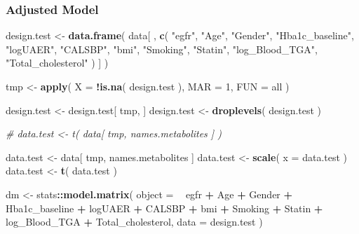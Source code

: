 \documentclass[]{article}
\newenvironment{Shaded}{\begin{snugshade}}{\end{snugshade}}
\newcommand{\CommentTok}[1]{\textcolor[rgb]{0.56,0.35,0.01}{\textit{#1}}}
\newcommand{\DataTypeTok}[1]{\textcolor[rgb]{0.13,0.29,0.53}{#1}}
\newcommand{\DecValTok}[1]{\textcolor[rgb]{0.00,0.00,0.81}{#1}}
\newcommand{\KeywordTok}[1]{\textcolor[rgb]{0.13,0.29,0.53}{\textbf{#1}}}
\newcommand{\NormalTok}[1]{#1}
\newcommand{\OperatorTok}[1]{\textcolor[rgb]{0.81,0.36,0.00}{\textbf{#1}}}
\newcommand{\StringTok}[1]{\textcolor[rgb]{0.31,0.60,0.02}{#1}}
\begin{document}
\newpage

\hypertarget{adjusted-model-1}{%
\subsubsection{Adjusted Model}\label{adjusted-model-1}}

\begin{Shaded}
\begin{Highlighting}[]
\NormalTok{design.test <-}\StringTok{ }
\StringTok{  }\KeywordTok{data.frame}\NormalTok{(}
\NormalTok{    data[ , }
          \KeywordTok{c}\NormalTok{(}
            \StringTok{"egfr"}\NormalTok{,}
            \StringTok{"Age"}\NormalTok{,}
            \StringTok{"Gender"}\NormalTok{, }
            \StringTok{"Hba1c_baseline"}\NormalTok{,}
            \StringTok{"logUAER"}\NormalTok{,}
            \StringTok{"CALSBP"}\NormalTok{,}
            \StringTok{"bmi"}\NormalTok{,}
            \StringTok{"Smoking"}\NormalTok{,}
            \StringTok{"Statin"}\NormalTok{,}
            \StringTok{"log_Blood_TGA"}\NormalTok{,}
            \StringTok{"Total_cholesterol"}
\NormalTok{          )}
\NormalTok{          ]}
\NormalTok{  )}

\NormalTok{tmp <-}\StringTok{ }
\StringTok{  }\KeywordTok{apply}\NormalTok{( }
    \DataTypeTok{X =} \OperatorTok{!}\KeywordTok{is.na}\NormalTok{( design.test ),}
    \DataTypeTok{MAR =} \DecValTok{1}\NormalTok{,}
    \DataTypeTok{FUN =}\NormalTok{ all}
\NormalTok{  )}

\NormalTok{design.test <-}\StringTok{ }\NormalTok{design.test[ tmp, ]}
\NormalTok{design.test <-}\StringTok{ }\KeywordTok{droplevels}\NormalTok{( design.test )}

\CommentTok{# data.test <- t( data[ tmp, names.metabolites ] )}

\NormalTok{data.test <-}\StringTok{ }\NormalTok{data[ tmp, names.metabolites ]}
\NormalTok{data.test <-}\StringTok{ }\KeywordTok{scale}\NormalTok{( }\DataTypeTok{x =}\NormalTok{ data.test )}
\NormalTok{data.test <-}\StringTok{ }\KeywordTok{t}\NormalTok{( data.test )}

\NormalTok{dm <-}\StringTok{ }
\StringTok{  }\NormalTok{stats}\OperatorTok{::}\KeywordTok{model.matrix}\NormalTok{( }
    \DataTypeTok{object =} 
      \OperatorTok{~}\StringTok{ }\NormalTok{egfr }\OperatorTok{+}\StringTok{ }
\StringTok{      }\NormalTok{Age }\OperatorTok{+}\StringTok{ }
\StringTok{      }\NormalTok{Gender }\OperatorTok{+}
\StringTok{      }\NormalTok{Hba1c_baseline }\OperatorTok{+}\StringTok{ }
\StringTok{      }\NormalTok{logUAER }\OperatorTok{+}\StringTok{ }
\StringTok{      }\NormalTok{CALSBP }\OperatorTok{+}\StringTok{ }
\StringTok{      }\NormalTok{bmi }\OperatorTok{+}\StringTok{ }
\StringTok{      }\NormalTok{Smoking }\OperatorTok{+}
\StringTok{      }\NormalTok{Statin }\OperatorTok{+}\StringTok{ }
\StringTok{      }\NormalTok{log_Blood_TGA }\OperatorTok{+}\StringTok{ }
\StringTok{      }\NormalTok{Total_cholesterol,}
    \DataTypeTok{data =}\NormalTok{ design.test}
\NormalTok{  )}


\end{Highlighting}
\end{Shaded}
\end{document}
